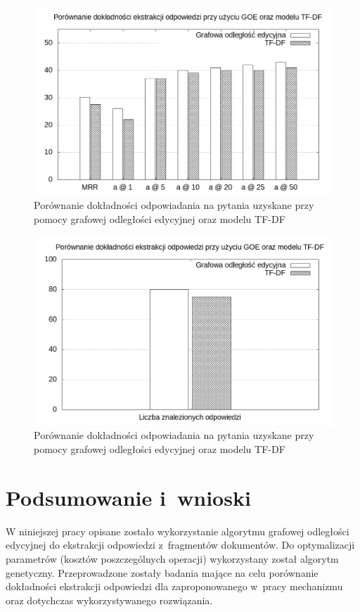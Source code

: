 \documentclass[a4paper, twoside, 12pt]{report}
\begin{document}
        \begin{figure}[p]
                \centering
                \includegraphics[scale=0.5]{mrr}
                \caption{Porównanie dokładności odpowiadania na pytania uzyskane przy pomocy grafowej odległości edycyjnej
                    oraz modelu TF-DF}
                \label{RESULTS1}
        \end{figure}

        \begin{figure}[p]
                \centering
                \includegraphics[scale=0.5]{znalezione_odpowiedzi}
                \caption{Porównanie dokładności odpowiadania na pytania uzyskane przy pomocy grafowej odległości edycyjnej
                    oraz modelu TF-DF}
                \label{RESULTS2}
        \end{figure}

\chapter{Podsumowanie i~wnioski}
    W niniejszej pracy opisane zostało wykorzystanie algorytmu grafowej odległości edycyjnej do ekstrakcji odpowiedzi
    z~fragmentów dokumentów. Do optymalizacji parametrów (kosztów poszczególnych operacji) wykorzystany został
    algorytm genetyczny. Przeprowadzone zostały badania mające na celu porównanie dokładności ekstrakcji odpowiedzi
    dla zaproponowanego w~pracy mechanizmu oraz dotychczas wykorzystywanego rozwiązania.
\end{document}

